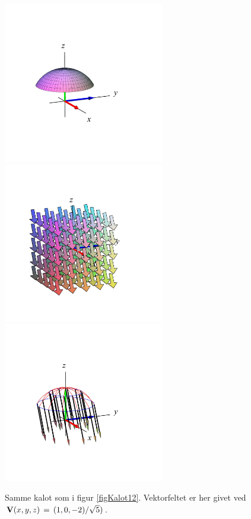 \begin{figure}[h]
\centerline{\includegraphics[width=70mm]{FIGS/plotKalotA1}\includegraphics[width=70mm]{FIGS/plotKalotA2}\includegraphics[width=70mm]{FIGS/plotKalotA3}}
\begin{center}
\caption{\small{Samme kalot som i figur \ref{figKalot12}. Vektorfeltet er her givet ved
${\bf V}(x,y,z) \, = \, (1, 0, -2)/\sqrt{5})$.}} \label{figKalotA12}
\end{center}
\end{figure}






